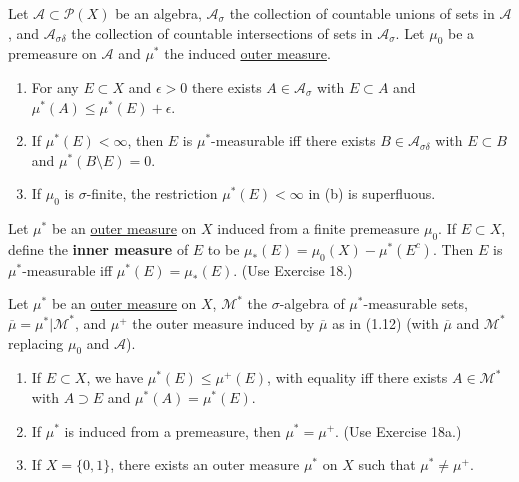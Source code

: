 	\begin{exercise}[Folland 1.18]
		Let $\mathcal{A} \subset \mathcal{P}(X)$ be an algebra, $\mathcal{A}_\sigma$ the collection of countable unions of sets in $\mathcal{A}$, and $\mathcal{A}_{\sigma\delta}$ the collection of countable intersections of sets in $\mathcal{A}_\sigma$. Let $\mu_0$ be a premeasure on $\mathcal{A}$ and $\mu^*$ the induced \hyperref[def:outer-measure]{outer measure}.
		\begin{enumerate}[label=\textbf{\alph*.}]
			\item For any $E \subset X$ and $\epsilon > 0$ there exists $A \in \mathcal{A}_\sigma$ with $E \subset A$ and $\mu^*(A) \le \mu^*(E) + \epsilon$.
			\item If $\mu^*(E) < \infty$, then $E$ is $\mu^*$-measurable iff there exists $B \in \mathcal{A}_{\sigma\delta}$ with $E \subset B$ and $\mu^*(B \setminus E) = 0$.
			\item If $\mu_0$ is $\sigma$-finite, the restriction $\mu^*(E) < \infty$ in (b) is superfluous.
		\end{enumerate}
	\end{exercise}
	\begin{solution}

	\end{solution}

	\begin{exercise}[Folland 1.19]
		Let $\mu^*$ be an \hyperref[def:outer-measure]{outer measure} on $X$ induced from a finite premeasure $\mu_0$. If $E \subset X$, define the \textbf{inner measure} of $E$ to be $\mu_*(E) = \mu_0(X) - \mu^*(E^c)$. Then $E$ is $\mu^*$-measurable iff $\mu^*(E) = \mu_*(E)$. (Use Exercise 18.)
	\end{exercise}
	\begin{solution}

	\end{solution}

	\begin{exercise}[Folland 1.20]
		Let $\mu^*$ be an \hyperref[def:outer-measure]{outer measure} on $X$, $\mathcal{M}^*$ the $\sigma$-algebra of $\mu^*$-measurable sets, $\overline{\mu} = \mu^*|\mathcal{M}^*$, and $\mu^+$ the outer measure induced by $\overline{\mu}$ as in (1.12) (with $\overline{\mu}$ and $\mathcal{M}^*$ replacing $\mu_0$ and $\mathcal{A}$).
		\begin{enumerate}[label=\textbf{\alph*.}]
			\item If $E \subset X$, we have $\mu^*(E) \le \mu^+(E)$, with equality iff there exists $A \in \mathcal{M}^*$ with $A \supset E$ and $\mu^*(A) = \mu^*(E)$.
			\item If $\mu^*$ is induced from a premeasure, then $\mu^* = \mu^+$. (Use Exercise 18a.)
			\item If $X = \{0, 1\}$, there exists an outer measure $\mu^*$ on $X$ such that $\mu^* \neq \mu^+$.
		\end{enumerate}
	\end{exercise}
	\begin{solution}

	\end{solution}

